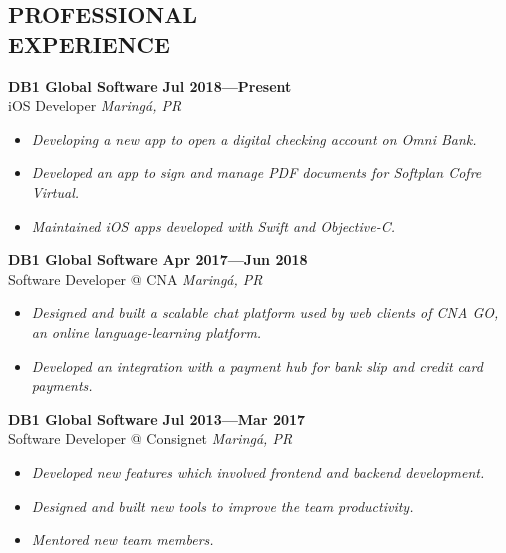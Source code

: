 \documentclass[line,margin]{res}
\begin{document}


\address{\sl marcosatanaka.com --- marcosatanaka@gmail.com --- (44) xxxxx - xxxx}


\begin{resume}


\section{PROFESSIONAL \\ EXPERIENCE}
  {\bf DB1 Global Software} \hfill {\bf Jul 2018---Present} \\
  iOS Developer \hfill {\sl Maring\'a, PR}\\[-6pt]
  \begin{itemize}
    \item {\sl Developing a new app to open a digital checking account on Omni Bank.}
    \item {\sl Developed an app to sign and manage PDF documents for Softplan Cofre Virtual.}
    \item {\sl Maintained iOS apps developed with Swift and Objective-C.}
  \end{itemize}

  {\bf DB1 Global Software} \hfill {\bf Apr 2017---Jun 2018} \\
  Software Developer @ CNA \hfill {\sl Maring\'a, PR}\\[-6pt]
  \begin{itemize}
    \item {\sl Designed and built a scalable chat platform used by web clients of CNA GO,
                    an online language-learning platform.}
    \item {\sl Developed an integration with a payment hub for
               bank slip and credit card payments.}
  \end{itemize}

  {\bf DB1 Global Software} \hfill {\bf Jul 2013---Mar 2017} \\
  Software Developer @ Consignet \hfill {\sl Maring\'a, PR}\\[-6pt]
  \begin{itemize}
    \item {\sl Developed new features which involved
               frontend and backend development.}
    \item {\sl Designed and built new tools to improve the team productivity.}
    \item {\sl Mentored new team members.}
  \end{itemize}


\end{resume}
\end{document}
